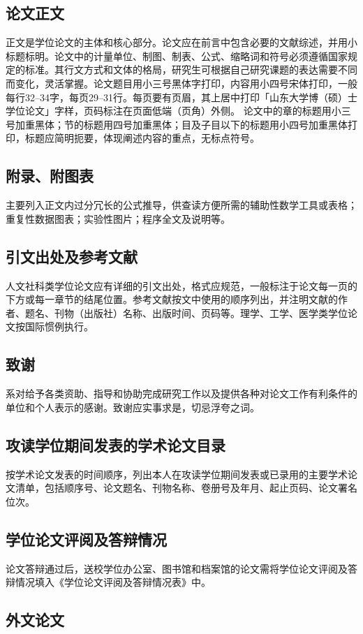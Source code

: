 \documentclass[openany]{sduthesis} %
\begin{document}
\subsection{论文正文}
正文是学位论文的主体和核心部分。论文应在前言中包含必要的文献综述，并用小标题标明。论文中的计量单位、制图、制表、公式、缩略词和符号必须遵循国家规定的标准。其行文方式和文体的格局，研究生可根据自己研究课题的表达需要不同而变化，灵活掌握。论文题目用小三号黑体字打印，内容用小四号宋体打印，一般每行32--34字，每页29--31行。每页要有页眉，其上居中打印「山东大学博（硕）士学位论文」字样，页码标注在页面低端（页角）外侧。 论文中的章的标题用小三号加重黑体；节的标题用四号加重黑体；目及子目以下的标题用小四号加重黑体打印，标题应简明扼要，体现阐述内容的重点，无标点符号。
\subsection{附录、附图表}
主要列入正文内过分冗长的公式推导，供查读方便所需的辅助性数学工具或表格；重复性数据图表；实验性图片；程序全文及说明等。
\subsection{引文出处及参考文献}
人文社科类学位论文应有详细的引文出处，格式应规范，一般标注于论文每一页的下方或每一章节的结尾位置。参考文献按文中使用的顺序列出，并注明文献的作者、题名、刊物（出版社）名称、出版时间、页码等。理学、工学、医学类学位论文按国际惯例执行。
\subsection{致谢}
系对给予各类资助、指导和协助完成研究工作以及提供各种对论文工作有利条件的单位和个人表示的感谢。致谢应实事求是，切忌浮夸之词。
\subsection{攻读学位期间发表的学术论文目录}
按学术论文发表的时间顺序，列出本人在攻读学位期间发表或已录用的主要学术论文清单，包括顺序号、论文题名、刊物名称、卷册号及年月、起止页码、论文署名位次。
\subsection{学位论文评阅及答辩情况}
论文答辩通过后，送校学位办公室、图书馆和档案馆的论文需将学位论文评阅及答辩情况填入《学位论文评阅及答辩情况表》中。
\subsection{外文论文}
\end{document}
